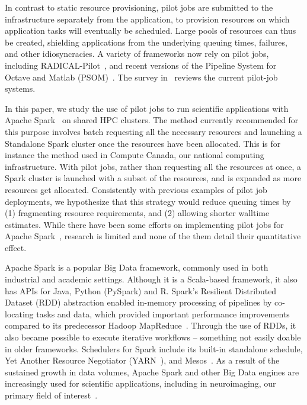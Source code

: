\documentclass{IEEEtran}
\begin{document}
In contrast to static resource provisioning, pilot jobs are submitted to
the infrastructure separately from the application, to provision resources
on which application tasks will eventually be scheduled. Large pools of
resources can thus be created, shielding applications from the underlying
queuing times, failures, and other idiosyncracies. A variety of frameworks
now rely on pilot jobs, including RADICAL-Pilot~\cite{merzky2015radical},
and recent versions of the Pipeline System for Octave and Matlab
(PSOM)~\cite{bellec2012pipeline}. The survey in~\cite{turilli2018comprehensive} reviews
the current pilot-job systems.

In this paper, we study the use of pilot jobs to run scientific
applications with Apache Spark~\cite{zaharia2016apache} on shared HPC
clusters. The method currently recommended for this purpose involves batch
requesting all the
necessary resources and launching a Standalone Spark cluster once the
resources have been allocated. This is for instance the method used in
Compute Canada,
 our national computing infrastructure. With pilot
jobs, rather than requesting all the resources at once, a Spark cluster is
launched with a subset of the resources, and is expanded as more resources
get allocated. Consistently with previous examples of pilot job
deployments, we hypothesize that this strategy would reduce queuing times
by (1) fragmenting resource requirements, and (2) allowing shorter walltime
estimates. While there have been some efforts on implementing pilot jobs
for Apache Spark~\cite{jha-spark-pbs}, research is limited and
none of the them detail their quantitative effect.

Apache Spark is a popular Big Data framework, commonly used in both
industrial and academic settings. Although it is a Scala-based framework,
it also has APIs for Java, Python (PySpark) and R. Spark's Resilient
Distributed Dataset (RDD) abstraction enabled in-memory processing of
pipelines by co-locating tasks and data, which provided important
performance improvements compared to its predecessor Hadoop
MapReduce~\cite{dean2008mapreduce}. Through the use of RDDs, it also became possible
to execute iterative workflows -- something not easily doable in older
frameworks. Schedulers for Spark include its built-in standalone schedule,
Yet Another Resource Negotiator (YARN~\cite{apache13yet}), and Mesos~\cite{hindman2011mesos}. As a
result of the sustained growth in data volumes, Apache Spark and other
Big Data engines are increasingly used for scientific applications,
including in neuroimaging, our primary field of
interest~\cite{boubela2016big,mehta2017comparative,maybethesimulationone,freeman2014mapping}.
\end{document}

